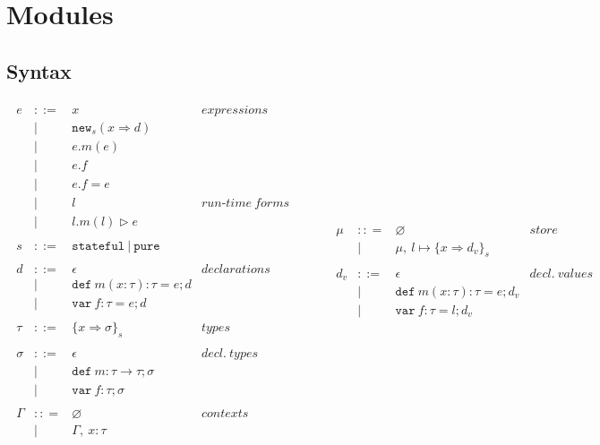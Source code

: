 \documentclass{llncs}
\newcommand{\keywadj}[1]{\mathtt{#1}}
\newcommand{\keyw}[1]{\keywadj{#1}~}
\begin{document}
\section{Modules}

\subsection{Syntax}

\[
\begin{array}{lll}
\begin{array}{lllr}
e & ::= & x & expressions \\
& | & \keywadj{new}_{s}(x \Rightarrow d) \\
& | & e.m(e)\\
& | & e.f \\
& | & e.f = e \\
& | & l & run\mbox{-}time~forms\\
& | & l.m(l) \rhd e \\
&&\\
s & ::= & \keyw{stateful} | ~\keyw{pure} \\
&&\\
d & ::= & \epsilon & declarations \\
  & |   & \keyw{def} m(x:\tau):\tau = e; d \\
  & |   & \keyw{var} f:\tau = e; d \\
&&\\
\tau & ::= & \{ x \Rightarrow \sigma \}_{s} & types \\
&&\\
\sigma & ::= & \epsilon & decl.~ types \\
       & |   & \keyw{def} m:\tau \rightarrow \tau; \sigma \\
       & |   & \keyw{var} f:\tau; \sigma \\
&&\\
\Gamma & :: = & \varnothing & contexts\\
& | & \Gamma,~x : \tau\\
\end{array}
& ~~~~~~
&
\begin{array}{lllr}
\mu & :: = & \varnothing & store\\
& | & \mu,~l \mapsto \{ x \Rightarrow d_v \}_{s}\\
&&\\
d_v & ::= & \epsilon & decl.~ values \\
  & |   & \keyw{def} m(x:\tau):\tau = e; d_v \\
  & |   & \keyw{var} f:\tau = l; d_v \\

\end{array}
\end{array}\]
\end{document}
